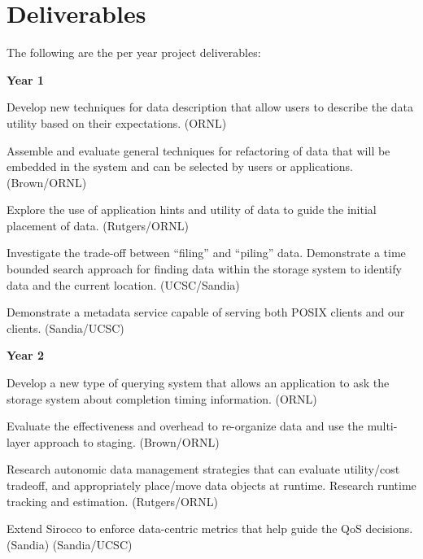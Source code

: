 \section{Deliverables}
The following are the per year project deliverables:

\textbf{Year 1}
\begin{tightItemize}
\item Develop new techniques for data description that allow users to 
describe the data utility based on their expectations. (ORNL)

\item Assemble and evaluate general techniques for refactoring of data
that will be embedded in the system and can be selected by users or applications. (Brown/ORNL)
\item Explore the use of application hints and utility of data to guide the initial placement of data. 
(Rutgers/ORNL)
\item Investigate the trade-off between ``filing'' and ``piling'' data. 
Demonstrate a time bounded search approach for finding data within the storage system
to identify data and the current location. (UCSC/Sandia)
\item Demonstrate a metadata service capable of serving both POSIX clients and our clients. (Sandia/UCSC)
\end{tightItemize}

\textbf{Year 2}
\begin{tightItemize}
\item Develop a new type of querying system that allows an application to ask the storage system
about completion timing information. (ORNL)
\item Evaluate the effectiveness and overhead to re-organize data and use the multi-layer approach 
to staging. (Brown/ORNL)
\item Research autonomic data management strategies that
can evaluate utility/cost tradeoff, and appropriately place/move data objects at runtime. 
Research runtime tracking and estimation. (Rutgers/ORNL)
\item Extend Sirocco to enforce data-centric metrics that help guide the QoS decisions. (Sandia)
(Sandia/UCSC)
\end{tightItemize}

